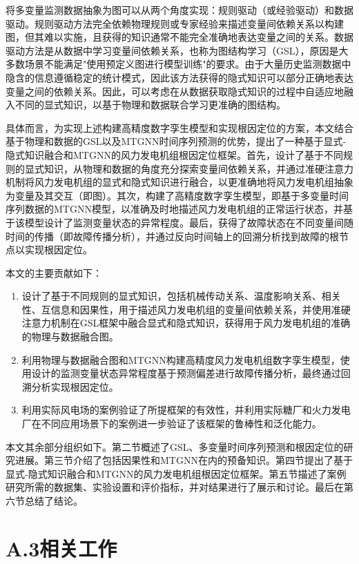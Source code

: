 将多变量监测数据抽象为图可以从两个角度实现：规则驱动（或经验驱动）和数据驱动。规则驱动方法完全依赖物理规则或专家经验来描述变量间依赖关系以构建图，但其难以实施，且获得的知识通常不能完全准确地表达变量之间的关系。数据驱动方法是从数据中学习变量间依赖关系，也称为图结构学习（GSL），原因是大多数场景不能满足"使用预定义图进行模型训练"的要求。由于大量历史监测数据中隐含的信息遵循稳定的统计模式，因此该方法获得的隐式知识可以部分正确地表达变量之间的依赖关系。因此，可以考虑在从数据获取隐式知识的过程中自适应地融入不同的显式知识，以基于物理和数据联合学习更准确的图结构。

具体而言，为实现上述构建高精度数字孪生模型和实现根因定位的方案，本文结合基于物理和数据的GSL以及MTGNN时间序列预测的优势，提出了一种基于显式-隐式知识融合和MTGNN的风力发电机组根因定位框架。首先，设计了基于不同规则的显式知识，从物理和数据的角度充分探索变量间依赖关系，并通过准硬注意力机制将风力发电机组的显式和隐式知识进行融合，以更准确地将风力发电机组抽象为变量及其交互（即图）。其次，构建了高精度数字孪生模型，即基于多变量时间序列数据的MTGNN模型，以准确及时地描述风力发电机组的正常运行状态，并基于该模型设计了监测变量状态的异常程度。最后，获得了故障状态在不同变量间随时间的传播（即故障传播分析），并通过反向时间轴上的回溯分析找到故障的根节点以实现根因定位。

本文的主要贡献如下：

\begin{enumerate}
\item[i)] 设计了基于不同规则的显式知识，包括机械传动关系、温度影响关系、相关性、互信息和因果性，用于描述风力发电机组的变量间依赖关系，并使用准硬注意力机制在GSL框架中融合显式和隐式知识，获得用于风力发电机组的准确的物理与数据融合图。

\item[ii)] 利用物理与数据融合图和MTGNN构建高精度风力发电机组数字孪生模型，使用设计的监测变量状态异常程度基于预测偏差进行故障传播分析，最终通过回溯分析实现根因定位。

\item[iii)] 利用实际风电场的案例验证了所提框架的有效性，并利用实际糖厂和火力发电厂在不同应用场景下的案例进一步验证了该框架的鲁棒性和泛化能力。
\end{enumerate}

本文其余部分组织如下。第二节概述了GSL、多变量时间序列预测和根因定位的研究进展。第三节介绍了包括因果性和MTGNN在内的预备知识。第四节提出了基于显式-隐式知识融合和MTGNN的风力发电机组根因定位框架。第五节描述了案例研究所需的数据集、实验设置和评价指标，并对结果进行了展示和讨论。最后在第六节总结了结论。

\section*{A.3\quad 相关工作}

